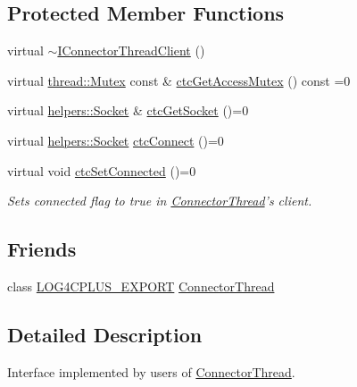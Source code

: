 \subsection*{Protected Member Functions}
\begin{DoxyCompactItemize}
\item 
virtual \hyperlink{classlog4cplus_1_1helpers_1_1IConnectorThreadClient_a52f26cbe61be5055654951ce61a111bf}{$\sim$\-I\-Connector\-Thread\-Client} ()
\item 
virtual \hyperlink{classlog4cplus_1_1thread_1_1Mutex}{thread\-::\-Mutex} const \& \hyperlink{classlog4cplus_1_1helpers_1_1IConnectorThreadClient_a3f3290a04323d1c47ce84b3f46d9a39b}{ctc\-Get\-Access\-Mutex} () const =0
\item 
virtual \hyperlink{classlog4cplus_1_1helpers_1_1Socket}{helpers\-::\-Socket} \& \hyperlink{classlog4cplus_1_1helpers_1_1IConnectorThreadClient_a6599c23d0aef8c71df2d0fbc7c6901f5}{ctc\-Get\-Socket} ()=0
\item 
virtual \hyperlink{classlog4cplus_1_1helpers_1_1Socket}{helpers\-::\-Socket} \hyperlink{classlog4cplus_1_1helpers_1_1IConnectorThreadClient_a267c793b19c71d3394515e906f636019}{ctc\-Connect} ()=0
\item 
virtual void \hyperlink{classlog4cplus_1_1helpers_1_1IConnectorThreadClient_aa68c91fad1931c359e9f6829b4ac1bb8}{ctc\-Set\-Connected} ()=0
\begin{DoxyCompactList}\small\item\em Sets connected flag to true in \hyperlink{classlog4cplus_1_1helpers_1_1ConnectorThread}{Connector\-Thread}'s client. \end{DoxyCompactList}\end{DoxyCompactItemize}
\subsection*{Friends}
\begin{DoxyCompactItemize}
\item 
class \hyperlink{config_8hxx_ab13cb1a5317c245ee2ef4f2bfe0cfb2d}{L\-O\-G4\-C\-P\-L\-U\-S\-\_\-\-E\-X\-P\-O\-R\-T} \hyperlink{classlog4cplus_1_1helpers_1_1IConnectorThreadClient_a247bcb3fd9a6d838270c90b3a0b9001f}{Connector\-Thread}
\end{DoxyCompactItemize}


\subsection{Detailed Description}
Interface implemented by users of \hyperlink{classlog4cplus_1_1helpers_1_1ConnectorThread}{Connector\-Thread}. 

